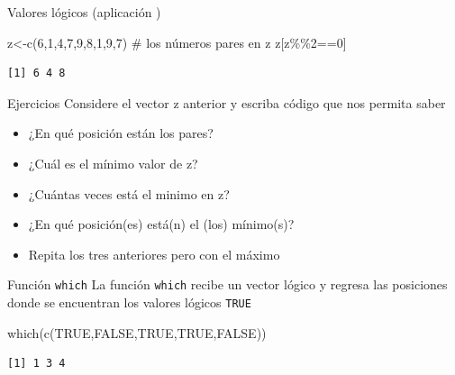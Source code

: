 \documentclass[
  ignorenonframetext,
  aspectratio=169,
  spanish,
]{beamer}
\newenvironment{Shaded}{\begin{snugshade}}{\end{snugshade}}
\newcommand{\CommentTok}[1]{\textcolor[rgb]{0.37,0.37,0.37}{#1}}
\newcommand{\ConstantTok}[1]{\textcolor[rgb]{0.56,0.35,0.01}{#1}}
\newcommand{\DecValTok}[1]{\textcolor[rgb]{0.68,0.00,0.00}{#1}}
\newcommand{\FunctionTok}[1]{\textcolor[rgb]{0.28,0.35,0.67}{#1}}
\newcommand{\NormalTok}[1]{\textcolor[rgb]{0.00,0.23,0.31}{#1}}
\newcommand{\OtherTok}[1]{\textcolor[rgb]{0.00,0.23,0.31}{#1}}
\newcommand{\SpecialCharTok}[1]{\textcolor[rgb]{0.37,0.37,0.37}{#1}}
\providecommand{\tightlist}{%
  \setlength{\itemsep}{0pt}\setlength{\parskip}{0pt}}
\begin{document}
\begin{frame}[fragile]{Valores lógicos (aplicación )}
\label{valores-luxf3gicos-aplicaciuxf3n-1}
\begin{Shaded}
\begin{Highlighting}[]
\NormalTok{z}\OtherTok{\textless{}{-}}\FunctionTok{c}\NormalTok{(}\DecValTok{6}\NormalTok{,}\DecValTok{1}\NormalTok{,}\DecValTok{4}\NormalTok{,}\DecValTok{7}\NormalTok{,}\DecValTok{9}\NormalTok{,}\DecValTok{8}\NormalTok{,}\DecValTok{1}\NormalTok{,}\DecValTok{9}\NormalTok{,}\DecValTok{7}\NormalTok{)}
\CommentTok{\# los números pares en z  }
\NormalTok{z[z}\SpecialCharTok{\%\%}\DecValTok{2}\SpecialCharTok{==}\DecValTok{0}\NormalTok{] }
\end{Highlighting}
\end{Shaded}

\begin{verbatim}
[1] 6 4 8
\end{verbatim}

\begin{block}{Ejercicios}
\label{ejercicios}
Considere el vector z anterior y escriba código que nos permita saber

\begin{itemize}
\tightlist
\item
  ¿En qué posición están los pares?
\item
  ¿Cuál es el mínimo valor de z?
\item
  ¿Cuántas veces está el minimo en z?
\item
  ¿En qué posición(es) está(n) el (los) mínimo(s)?
\item
  Repita los tres anteriores pero con el máximo
\end{itemize}
\end{block}
\end{frame}

\begin{frame}[fragile]{Función \texttt{which}}
\label{funciuxf3n-which}
La función \texttt{which} recibe un vector lógico y regresa las
posiciones donde se encuentran los valores lógicos \texttt{TRUE}

\begin{Shaded}
\begin{Highlighting}[]
\FunctionTok{which}\NormalTok{(}\FunctionTok{c}\NormalTok{(}\ConstantTok{TRUE}\NormalTok{,}\ConstantTok{FALSE}\NormalTok{,}\ConstantTok{TRUE}\NormalTok{,}\ConstantTok{TRUE}\NormalTok{,}\ConstantTok{FALSE}\NormalTok{))}
\end{Highlighting}
\end{Shaded}

\begin{verbatim}
[1] 1 3 4
\end{verbatim}
\end{frame}
\end{document}
